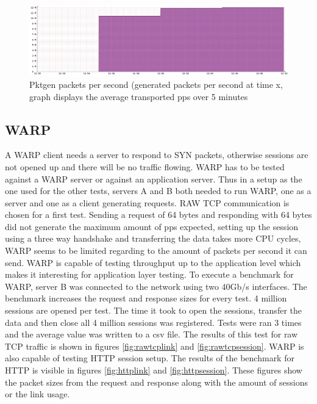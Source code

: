 \begin{figure}
  \includegraphics[scale=0.35]{images/pktgen_pps.png}
  \caption{Pktgen packets per second (generated packets per second at time x, graph displays the average transported pps over 5 minutes}
  \label{fig:pktgenpps}
\end{figure}

\newpage

\subsection{WARP}
A WARP client needs a server to respond to SYN packets, otherwise sessions are not opened up and there will be no traffic flowing. 
WARP has to be tested against a WARP server or against an application server. 
Thus in a setup as the one used for the other tests, servers A and B both needed to run WARP, one as a server and one as a client generating requests. RAW TCP communication is chosen for a first test. 
Sending a request of 64 bytes and responding with 64 bytes did not generate the maximum amount of pps expected, setting up the session using a three way handshake and transferring the data takes more CPU cycles, WARP seems to be limited regarding to the amount of packets per second it can send. WARP is capable of testing throughput up to the application level which makes it interesting for application layer testing.
To execute a benchmark for WARP, server B was connected to the network using two 40Gb/s interfaces. 
The benchmark increases the request and response sizes for every test. 4 million sessions are opened per test. The time it took to open the sessions, transfer the data and then close all 4 million sessions was registered. Tests were ran 3 times and the average value was written to a csv file. 
The results of this test for raw TCP traffic is shown in figures \ref{fig:rawtcplink} and \ref{fig:rawtcpsession}. 
WARP is also capable of testing HTTP session setup. The results of the benchmark for HTTP is visible in figures \ref{fig:httplink} and \ref{fig:httpsession}.
These figures show the packet sizes from the request and response along with the amount of sessions or the link usage.


